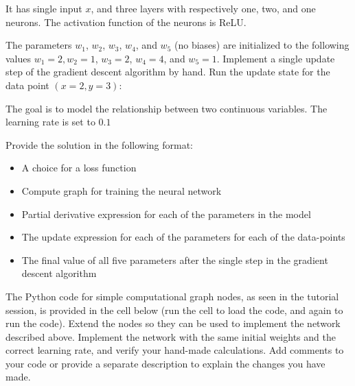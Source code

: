 \documentclass[11pt]{article}
\providecommand{\tightlist}{%
      \setlength{\itemsep}{0pt}\setlength{\parskip}{0pt}}
\begin{document}
It has single input \(x\), and three layers with respectively one, two,
and one neurons. The activation function of the neurons is ReLU.

The parameters \(w_1\), \(w_2\), \(w_3\), \(w_4\), and \(w_5\) (no
biases) are initialized to the following values \(w_1 = 2, w_2 = 1\),
\(w_3 = 2\), \(w_4 = 4\), and \(w_5 = 1\). Implement a single update
step of the gradient descent algorithm by hand. Run the update state for
the data point \((x=2, y=3)\):

The goal is to model the relationship between two continuous variables.
The learning rate is set to \(0.1\)

Provide the solution in the following format:

\begin{itemize}
\tightlist
\item
  A choice for a loss function
\item
  Compute graph for training the neural network
\item
  Partial derivative expression for each of the parameters in the model
\item
  The update expression for each of the parameters for each of the
  data-points
\item
  The final value of all five parameters after the single step in the
  gradient descent algorithm
\end{itemize}

The Python code for simple computational graph nodes, as seen in the
tutorial session, is provided in the cell below (run the cell to load
the code, and again to run the code). Extend the nodes so they can be
used to implement the network described above. Implement the network
with the same initial weights and the correct learning rate, and verify
your hand-made calculations. Add comments to your code or provide a
separate description to explain the changes you have made.
\end{document}

